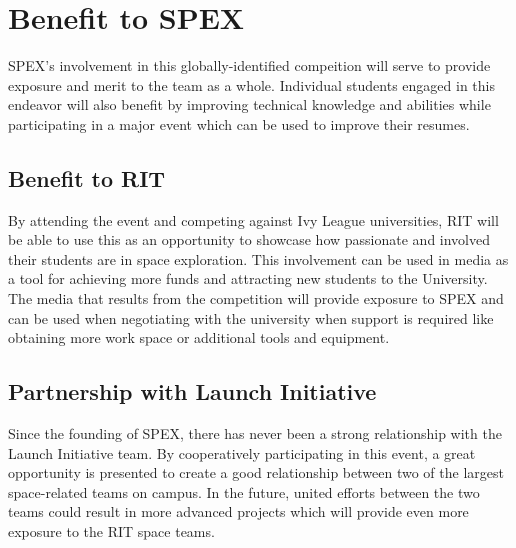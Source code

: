\documentclass[conference]{IEEEtran} %
\begin{document}
\section{Benefit to SPEX}
\label{sec:benefit}

SPEX's involvement in this globally-identified compeition will serve to provide exposure and merit to the team as a whole.
Individual students engaged in this endeavor will also benefit by improving technical knowledge and abilities while
participating in a major event which can be used to improve their resumes.


\subsection{Benefit to RIT}
\label{subsec:Benefit to RIT}
By attending the event and competing against Ivy League universities, RIT will be able to use this as an opportunity to showcase
how passionate and involved their students are in space exploration. This involvement can be used in media as a tool for
achieving more funds and attracting new students to the University. The media that results from the competition will provide
exposure to SPEX and can be used when negotiating with the university when support is required like obtaining more work space or
additional tools and equipment.

\subsection{Partnership with Launch Initiative}
\label{subsec:traceability}
Since the founding of SPEX, there has never been a strong relationship with the Launch Initiative team. By cooperatively participating
in this event, a great opportunity is presented to create a good relationship between two of the largest space-related teams on
campus. In the future, united efforts between the two teams could result in more advanced projects which will provide
even more exposure to the RIT space teams.
\end{document}
